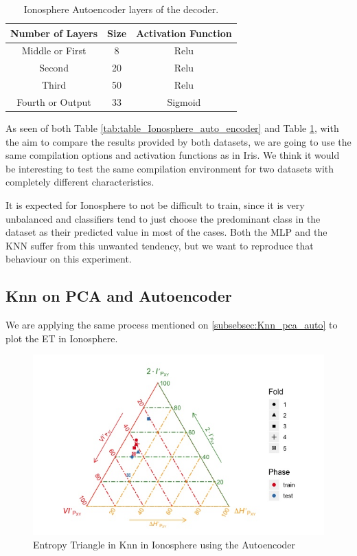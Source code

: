\documentclass[12pt]{report}
\begin{document}
\begin{table}[H]
	\caption{Ionosphere Autoencoder layers of the decoder.}
	\begin{center}
	\label{tab:table_Ionosphere_auto_decoder}
		\begin{tabular}{c|c|c} %
			\textbf{Number of Layers} & \textbf{Size} & \textbf{Activation Function} \\
			\hline
			Middle or First & 8 & Relu\\
			Second & 20 & Relu\\
			Third & 50 & Relu\\
			Fourth or Output & 33 & Sigmoid\\
		\end{tabular}
	\end{center}
\end{table}

As seen of both Table \ref{tab:table_Ionosphere_auto_encoder} and Table \ref{tab:table_Ionosphere_auto_decoder}, with the aim to compare the results provided by both datasets, we are going to use the same compilation options and activation functions as in Iris. We think it would be interesting to test the same compilation environment for two datasets with completely different characteristics.\par

It is expected for Ionosphere to not be difficult to train, since it is very unbalanced and classifiers tend to just choose the predominant class in the dataset as their predicted value in most of the cases. Both the MLP and the KNN suffer from this unwanted tendency, but we want to reproduce that behaviour on this experiment.

\subsection{Knn on PCA and Autoencoder}

We are applying the same process mentioned on \ref{subsebsec:Knn_pca_auto} to plot the ET in Ionosphere. 

\begin{figure}[H]
	\centering
	\includegraphics[width=1\linewidth]{Figuras_tfg/ET_knn_Ionosphere_auto}
	\caption{Entropy Triangle in Knn in Ionosphere using the Autoencoder}
	\label{fig:figure_Knn_Ionosphere_ET_Auto}
\end{figure}
\end{document}
